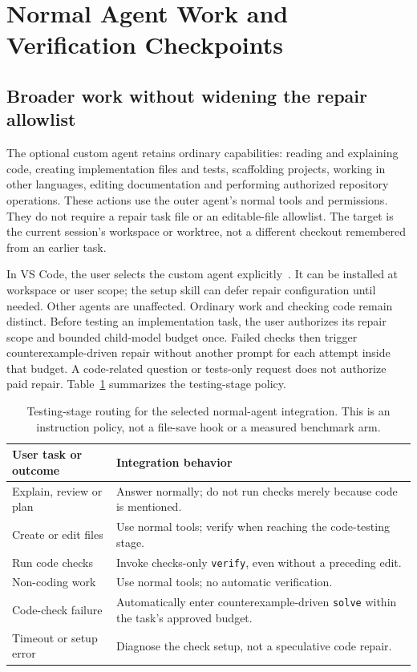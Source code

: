 \documentclass[10pt,twocolumn,a4paper]{article}
\begin{document}
\section{Normal Agent Work and Verification Checkpoints}
\label{sec:normal-agent}
\subsection{Broader work without widening the repair allowlist}
The optional custom agent retains ordinary capabilities: reading and
explaining code, creating implementation files and tests, scaffolding projects,
working in other languages, editing documentation and performing authorized
repository operations. These actions use the outer agent's normal tools and
permissions. They do not require a repair task file or an editable-file
allowlist. The target is the current session's workspace or worktree, not a
different checkout remembered from an earlier task.

In VS Code, the user selects the custom agent explicitly~\cite{vscode-agents}.
It can be installed at workspace or user scope; the setup skill can defer
repair configuration until needed. Other agents are unaffected.
Ordinary work and checking code remain distinct. Before testing an implementation
task, the user authorizes its repair scope and bounded child-model budget once.
Failed checks then trigger counterexample-driven repair without another prompt
for each attempt inside that budget. A code-related question or tests-only
request does not authorize paid repair. Table~\ref{tab:normal-routing}
summarizes the testing-stage policy.

\begin{table}[t]
\centering\small
\begin{tabular}{@{}p{}p{}@{}}
\toprule
User task or outcome & Integration behavior\\
\midrule
Explain, review or plan & Answer normally; do not run checks merely because code is mentioned.\\
Create or edit files & Use normal tools; verify when reaching the code-testing stage.\\
Run code checks & Invoke checks-only \texttt{verify}, even without a preceding edit.\\
Non-coding work & Use normal tools; no automatic verification.\\
Code-check failure & Automatically enter counterexample-driven \texttt{solve} within the task's approved budget.\\
Timeout or setup error & Diagnose the check setup, not a speculative code repair.\\
\bottomrule
\end{tabular}
\caption{Testing-stage routing for the selected normal-agent integration.
This is an instruction policy, not a file-save hook or a measured benchmark arm.}
\label{tab:normal-routing}
\end{table}
\end{document}

